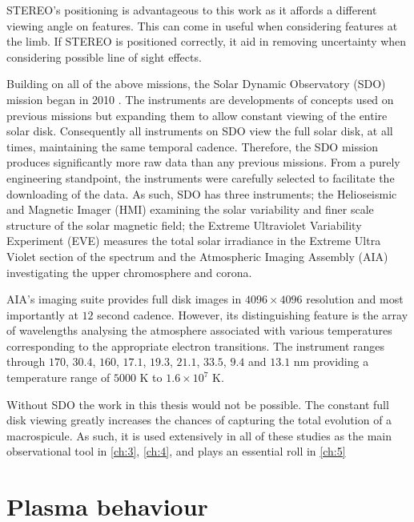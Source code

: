 STEREO's positioning is advantageous to this work as it affords a different viewing angle on features.
This can come in useful when considering features at the limb.
If STEREO is positioned correctly, it aid in removing uncertainty when considering possible line of sight effects.

Building on all of the above missions, the Solar Dynamic Observatory (SDO) mission began in 2010 \cite{Kaiser2008}.
The instruments are developments of concepts used on previous missions but expanding them to allow constant viewing of the entire solar disk.
Consequently all instruments on SDO view the full solar disk, at all times, maintaining the same temporal cadence. 
Therefore, the SDO mission produces significantly more raw data than any previous missions.
From a purely engineering standpoint, the instruments were carefully selected to facilitate the downloading of the data.
As such, SDO has three instruments; the Helioseismic and Magnetic Imager (HMI) examining the solar variability and finer scale structure of the solar magnetic field; the Extreme Ultraviolet Variability Experiment (EVE) measures the total solar irradiance in the Extreme Ultra Violet section of the spectrum and the Atmospheric Imaging Assembly (AIA) investigating the upper chromosphere and corona.

AIA's imaging suite provides full disk images in $4096 \times 4096$ resolution and most importantly at $12$ second cadence.
However, its distinguishing feature is the array of wavelengths analysing the atmosphere \cite{AIAspec} associated with various temperatures corresponding to the appropriate electron transitions.
The instrument ranges through $170$, $30.4$, $160$, $17.1$, $19.3$, $21.1$, $33.5$, $9.4$ and $13.1$ nm providing a temperature range of $5000$ K to $1.6 \times 10^7$ K.

Without SDO the work in this thesis would not be possible.
The constant full disk viewing greatly increases the chances of capturing the total evolution of a macrospicule.
As such, it is used extensively in all of these studies as the main observational tool in \cref{ch:3}, \cref{ch:4}, and plays an essential roll in \cref{ch:5} 


\section{Plasma behaviour}

